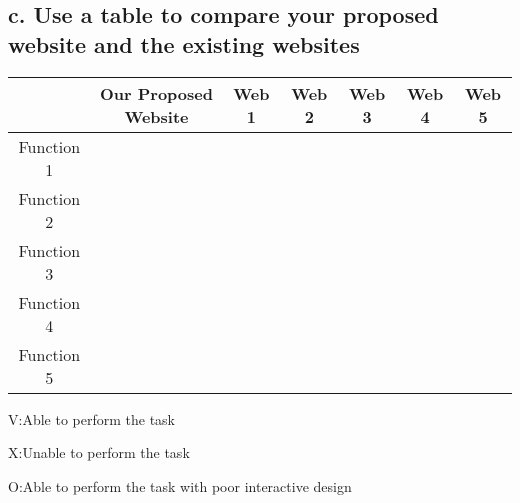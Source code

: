 \documentclass{article}
\begin{document}
\subsection{c. Use a table to compare your proposed website and the existing websites}



\begin{table}[h!]
    \centering
    \begin{tabular}{|c|c|c|c|c|c|c|}
    \hline
                   &  Our Proposed Website & Web 1 & Web 2 & Web 3 & Web 4 & Web 5 \\
    \hline
    Function 1    &            &       &       &       &       &              \\
    \hline
    Function 2    &            &       &       &       &       &              \\
    \hline
    Function 3    &            &       &       &       &       &             \\
    \hline
    Function 4    &            &       &       &       &       &              \\
    \hline
    Function 5    &            &       &       &       &       &              \\ 
    \hline
    \end{tabular}
\end{table}
V:Able to perform the task\par
X:Unable to perform the task\par
O:Able to perform the task with poor interactive design\par
\end{document}

